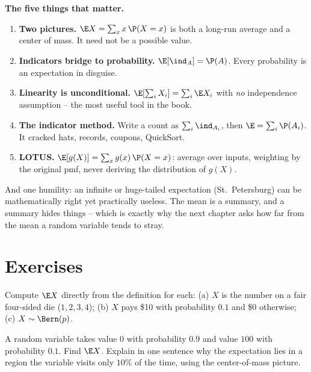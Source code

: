\begin{focusbox}
\textbf{The five things that matter.}
\begin{enumerate}
  \item \textbf{Two pictures.} $\E X = \sum_x x\,\P(X=x)$ is both a long-run
  average and a center of mass. It need not be a possible value.
  \item \textbf{Indicators bridge to probability.} $\E[\ind_A] = \P(A)$. Every
  probability is an expectation in disguise.
  \item \textbf{Linearity is unconditional.} $\E[\sum_i X_i] = \sum_i \E X_i$
  with \emph{no} independence assumption -- the most useful tool in the book.
  \item \textbf{The indicator method.} Write a count as $\sum_i \ind_{A_i}$,
  then $\E = \sum_i \P(A_i)$. It cracked hats, records, coupons, QuickSort.
  \item \textbf{LOTUS.} $\E[g(X)] = \sum_x g(x)\,\P(X=x)$: average over inputs,
  weighting by the original pmf, never deriving the distribution of $g(X)$.
\end{enumerate}
And one humility: an infinite or huge-tailed expectation (St.\ Petersburg) can be
mathematically right yet practically useless. The mean is a summary, and a summary
hides things -- which is exactly why the next chapter asks how far from the mean a
random variable tends to stray.
\end{focusbox}

\section*{Exercises}

\begin{exercise}
\label{ch08:exr-warmup}
Compute $\E X$ directly from the definition for each:
(a) $X$ is the number on a fair four-sided die ($1,2,3,4$);
(b) $X$ pays \$10 with probability $0.1$ and \$0 otherwise;
(c) $X \sim \Bern(p)$.
\end{exercise}

\begin{exercise}
\label{ch08:exr-com}
A random variable takes value $0$ with probability $0.9$ and value $100$ with
probability $0.1$. Find $\E X$. Explain in one sentence why the expectation lies
in a region the variable visits only $10\%$ of the time, using the center-of-mass
picture.
\end{exercise}

